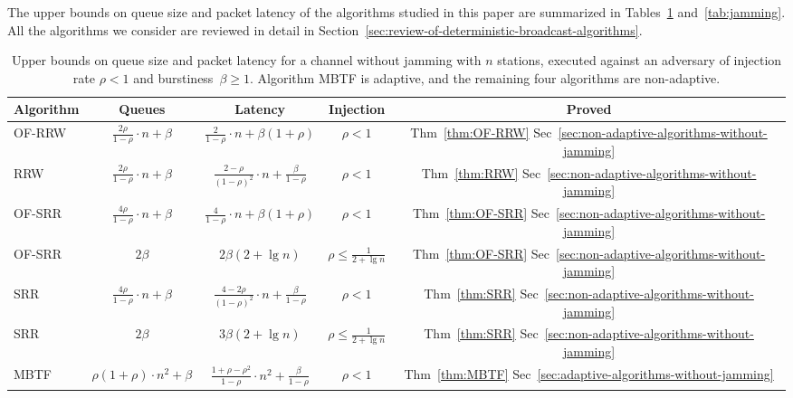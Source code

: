 \documentclass[11pt]{article}
\newcommand{\FF}{\vspace*{\medskipamount}}
\newcommand{\RB}{\raisebox{3ex}{~}}
\newcommand{\LB}{\raisebox{-1.5ex}{~}}
\newlength{\pagewidth}
\begin{document}
The upper bounds on queue size and packet latency of the algorithms studied in this paper are summarized in Tables~\ref{tab:no-jamming} and~\ref{tab:jamming}.
All the algorithms we consider are reviewed in detail in Section~\ref{sec:review-of-deterministic-broadcast-algorithms}.



\begin{table}[t]
\begin{center}
\begin{tabular}{|l |c |c |c|c|}
\hline
\RB \LB
Algorithm &Queues &Latency& Injection& Proved\\
\hline
\hline
\RB \LB
\textsc{OF-RRW}  & $\frac{2\rho }{1-\rho}\cdot n +\beta$&$\frac{2}{1-\rho}\cdot n +\beta(1+\rho)$ &$\rho<1$ & Thm~\ref{thm:OF-RRW} Sec~\ref{sec:non-adaptive-algorithms-without-jamming}\\
\hline
\RB \LB
\textsc{RRW} \cite{ChlebusKR-TALG12}&$\frac{2\rho }{1-\rho}\cdot n +\beta$ & $\frac{2-\rho}{(1-\rho)^2} \cdot n+ \frac{\beta}{1-\rho}$ &$\rho<1$& Thm~\ref{thm:RRW} Sec~\ref{sec:non-adaptive-algorithms-without-jamming}\\
\hline
\RB \LB
\textsc{OF-SRR} & $\frac{4\rho }{1-\rho}\cdot n  +\beta$  & $\frac{4}{1-\rho}\cdot n +\beta(1+\rho)$  & $\rho<1$& Thm~\ref{thm:OF-SRR} Sec~\ref{sec:non-adaptive-algorithms-without-jamming}\\
\hline
\RB \LB
\textsc{OF-SRR} & $2\beta$& $2\beta(2+\lg n)$ & $\rho \le \frac{1}{2+\lg n}$& Thm~\ref{thm:OF-SRR} Sec~\ref{sec:non-adaptive-algorithms-without-jamming}\\
\hline
\RB \LB
\textsc{SRR} \cite{ChlebusKR-TALG12} & $\frac{4\rho }{1-\rho}\cdot n  +\beta$& $\frac{4-2\rho}{(1-\rho)^2}\cdot n +\frac{\beta}{1-\rho} $ &$\rho<1$& Thm~\ref{thm:SRR} Sec~\ref{sec:non-adaptive-algorithms-without-jamming}\\
\hline
\RB \LB
\textsc{SRR} \cite{ChlebusKR-TALG12} & $2\beta$& $3\beta(2+\lg n)$ &$\rho \le \frac{1}{2+\lg n}$& Thm~\ref{thm:SRR} Sec~\ref{sec:non-adaptive-algorithms-without-jamming}\\
\hline
\RB \LB
 \textsc{MBTF} \cite{ChlebusKR09} & $\rho (1+\rho)\cdot n^2 + \beta $ & $\frac{1+\rho-\rho^2}{1-\rho} \cdot n^2 + \frac{\beta}{1-\rho}$ &$\rho<1$& Thm~\ref{thm:MBTF} Sec~\ref{sec:adaptive-algorithms-without-jamming}\\
\hline
\end{tabular}
\parbox{\pagewidth}{\FF\caption{\label{tab:no-jamming} 
Upper bounds on queue size and packet latency for a channel   without jamming with $n$ stations, executed against an adversary of injection rate $\rho<1$ and burstiness~$\beta\ge 1$. 
Algorithm  \textsc{MBTF}  is adaptive, and the remaining four algorithms are non-adaptive.
}}
\end{center}
\end{table}
\end{document}
